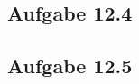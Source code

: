 \documentclass{standalone}
\begin{document}
\subsection{Aufgabe 12.4}


\subsection{Aufgabe 12.5}
\end{document}

